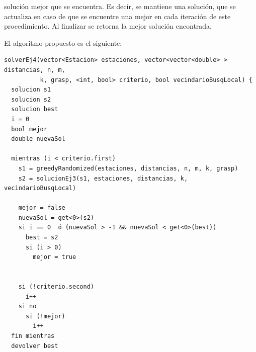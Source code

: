 solución mejor que se encuentra. Es decir, se mantiene una solución, que se actualiza en caso de que se encuentre una mejor en cada iteración de este procedimiento. Al finalizar se retorna la mejor solución encontrada.

        El algoritmo propuesto es el siguiente:

         \begin{codesnippet}
            \begin{verbatim}
solverEj4(vector<Estacion> estaciones, vector<vector<double> > distancias, n, m,
          k, grasp, <int, bool> criterio, bool vecindarioBusqLocal) {
  solucion s1
  solucion s2
  solucion best
  i = 0
  bool mejor
  double nuevaSol

  mientras (i < criterio.first)
    s1 = greedyRandomized(estaciones, distancias, n, m, k, grasp)
    s2 = solucionEj3(s1, estaciones, distancias, k, vecindarioBusqLocal)

    mejor = false
    nuevaSol = get<0>(s2)
    si i == 0  ó (nuevaSol > -1 && nuevaSol < get<0>(best)) 
      best = s2
      si (i > 0) 
        mejor = true
      
    
    si (!criterio.second)
      i++
    si no
      si (!mejor)
        i++
  fin mientras
  devolver best
            \end{verbatim}
            \end{codesnippet}


